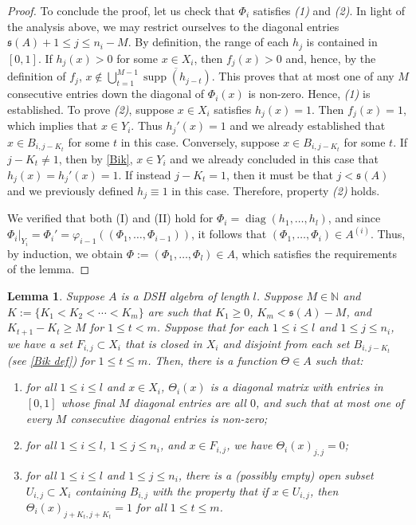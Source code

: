 \documentclass[12pt]{amsart}
\numberwithin{equation}{section}
\newtheorem{lemma}[theorem]{Lemma}
\theoremstyle{definition}
\theoremstyle{remark}
\newcommand{\diag}{\operatorname{diag}}
\newcommand{\supp}{\operatorname{supp}}
\newcommand{\NN}{\mathbb{N}}
\begin{document}
\begin{proof}
	To conclude the proof, let us check that $\Phi_{i}$ satisfies \textit{(1)} and \textit{(2)}. In light of the analysis above, we may restrict ourselves to the diagonal entries $\mathfrak{s}(A)+1\leq j\leq n_{i}-M$. By definition, the range of each $h_{j}$ is contained in $[0,1]$. If $h_{j}(x)>0$ for some $x\in X_{i}$, then $f_{j}(x)>0$ and, hence, by the definition of $f_{j}$, $x\notin \bigcup_{t=1}^{M-1}\overline{\supp(h_{j-t})}$. This proves that at most one of any $M$ consecutive entries down the diagonal of $\Phi_{i}(x)$ is non-zero. Hence, \textit{(1)} is established. To prove \textit{(2)}, suppose $x\in X_{i}$ satisfies $h_{j}(x)=1$. Then $f_{j}(x)=1$, which implies that $x\in Y_{i}$. Thus $h_{j}'(x)=1$ and we already established that $x\in B_{i,j-K_{t}}$ for some $t$ in this case. Conversely, suppose $x\in B_{i,j-K_{t}}$ for some $t$. If $j-K_{t}\not=1$, then by \autoref{Bik}, $x\in Y_{i}$ and we already concluded in this case that $h_{j}(x)=h_{j}'(x)=1$. If instead $j-K_{t}=1$, then it must be that $j< \mathfrak{s}(A)$ and we previously defined $h_{j}\equiv 1$ in this case. Therefore, property \textit{(2)} holds.
	
	We verified that both (I) and (II) hold for $\Phi_{i}=\diag(h_{1},\ldots,h_{ l })$, and since $\Phi_{i}|_{Y_{i}}=\Phi_{i}'=\varphi_{i-1}((\Phi_{1},\ldots,\Phi_{i-1}))$, it follows that $(\Phi_{1},\ldots,\Phi_{i})\in A^{(i)}$. Thus, by induction, we obtain $\Phi:=(\Phi_{1},\ldots,\Phi_{ l })\in A$, which satisfies the requirements of the lemma. 
\end{proof}

\begin{lemma}
	\label{indicators}
	Suppose $A$ is a DSH algebra of length $ l $. Suppose $M\in\NN$ and $K:=\{K_{1}< K_{2}<\cdots<K_{m}\}$ are such that $K_{1}\geq 0$, $K_{m}<\mathfrak{s}(A)-M$, and $K_{t+1}-K_{t}\geq M$ for $1\leq t < m$. Suppose that for each $1\leq i\leq  l $ and $1\leq j\leq n_{i}$, we have a set $F_{i,j}\subset X_{i}$ that is closed in $X_{i}$ and disjoint from each set $B_{i,j-K_{t}}$ (see \autoref{Bik def}) for $1\leq t\leq m$. Then, there is a function $\Theta\in A$ such that:
	\begin{enumerate}
		\item for all $1\leq i\leq  l $ and $x\in X_{i}$, $\Theta_{i}(x)$ is a diagonal matrix with entries in $[0,1]$ whose final $M$ diagonal entries are all $0$, and such that at most one of every $M$ consecutive diagonal entries is non-zero;
		\item for all $1\leq i\leq  l $, $1\leq j\leq n_{i}$, and $x\in F_{i,j}$, we have $\Theta_{i}(x)_{j,j}=0$;
		\item for all $1\leq i\leq  l $ and $1\leq j\leq n_{i}$, there is a (possibly empty) open subset $U_{i,j}\subset X_{i}$ containing $B_{i,j}$ with the property that if $x\in U_{i,j}$, then $\Theta_{i}(x)_{j+K_{t},j+K_{t}}=1$ for all $1\leq t\leq m$. 
	\end{enumerate}
\end{lemma}
\end{document}
